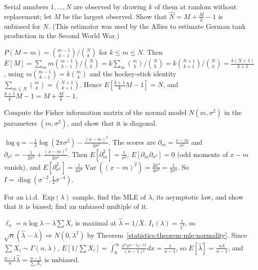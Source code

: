 \begin{exercise}\label{statistics:exercise-german-tank}
Serial numbers $1, \ldots, N$ are observed by drawing $k$ of them at random without replacement; let $M$ be the largest observed. Show that $\hat N = M + \frac Mk - 1$ is unbiased for $N$. (This estimator was used by the Allies
to estimate German tank production in the Second World War.)
\end{exercise}

\begin{solution}
$P(M = m) = \binom{m - 1}{k - 1}/\binom Nk$ for $k \leq m \leq N$. Then $E[M] = \sum_mm\binom{m-1}{k-1}/\binom Nk = k\sum_m\binom mk/\binom Nk = k\binom{N+1}{k+1}/\binom Nk = \frac{k(N + 1)}{k + 1}$, using $m\binom{m-1}{k-1} = k\binom mk$ and the
hockey-stick identity $\sum_{m \leq N}\binom mk = \binom{N+1}{k+1}$. Hence $E[\frac{k + 1}{k}M - 1] = N$, and $\frac{k + 1}{k}M - 1 = M + \frac Mk - 1$.
\end{solution}

\begin{exercise}\label{statistics:exercise-fisher-normal}
Compute the Fisher information matrix of the normal model $N(m, \sigma^2)$ in the parameters $(m, \sigma^2)$, and show that it is diagonal.
\end{exercise}

\begin{solution}
$\log q = -\frac12\log(2\pi\sigma^2) - \frac{(x - m)^2}{2\sigma^2}$. The scores are $\partial_m = \frac{x - m}{\sigma^2}$ and $\partial_{\sigma^2} = -\frac{1}{2\sigma^2} + \frac{(x - m)^2}{2\sigma^4}$. Then
$E[\partial_m^2] = \frac{1}{\sigma^2}$, $E[\partial_m\partial_{\sigma^2}] = 0$ (odd moments of $x - m$ vanish), and $E[\partial_{\sigma^2}^2] = \frac{1}{4\sigma^8}\operatorname{Var}((x - m)^2) = \frac{2\sigma^4}{4\sigma^8} = \frac{1}{2\sigma^4}$. So
$I = \operatorname{diag}(\sigma^{-2}, \frac12\sigma^{-4})$.
\end{solution}

\begin{exercise}\label{statistics:exercise-exponential-mle}
For an i.i.d.\ $\mathrm{Exp}(\lambda)$ sample, find the MLE of $\lambda$, its asymptotic law, and show that it is biased; find an unbiased multiple of it.
\end{exercise}

\begin{solution}
$\ell_n = n\log\lambda - \lambda\sum X_i$ is maximal at $\hat\lambda = 1/\bar X$. $I_1(\lambda) = \frac{1}{\lambda^2}$, so $\sqrt n(\hat\lambda - \lambda) \Rightarrow N(0, \lambda^2)$ by Theorem~\ref{statistics:theorem-mle-normality}. Since $\sum X_i \sim \Gamma(n, \lambda)$,
$E[1/\sum X_i] = \int_0^\infty\frac{\lambda^nx^{n-2}e^{-\lambda x}}{(n - 1)!}dx = \frac{\lambda}{n - 1}$, so $E[\hat\lambda] = \frac{n\lambda}{n - 1}$, and $\frac{n - 1}{n}\hat\lambda = \frac{n - 1}{\sum X_i}$ is unbiased.
\end{solution}


